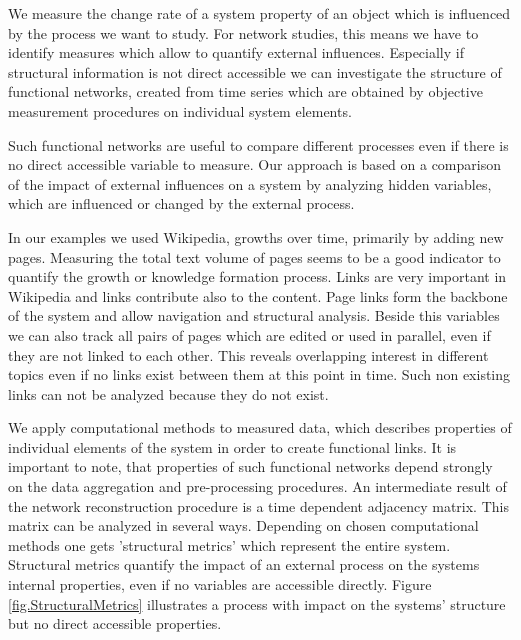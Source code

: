 \documentclass[a4paper,10pt]{scrbook}
\begin{document}
We measure the change rate of a system property of an object which is influenced by the process we want to study. For network studies, this means we have to identify measures which allow to quantify external influences. Especially if structural information is not direct accessible we can investigate the structure of functional networks, created from time series which are obtained by objective measurement procedures on individual system elements.

Such functional networks are useful to compare different processes even if there is no direct accessible variable to measure. Our approach is based on a comparison of the impact of external influences on a system by analyzing hidden variables, which are influenced or changed by the external process. 

In our examples we used Wikipedia, growths over time, primarily by adding new pages. Measuring the total text volume of pages seems to be a good indicator to quantify the growth or knowledge formation process. Links are very important in Wikipedia and links contribute also to the content. Page links form the backbone of the system and allow navigation and structural analysis. Beside this variables we can also track all pairs of pages which are edited or used in parallel, even if they are not linked to each other. This reveals overlapping interest in different topics even if no links exist between them at this point in time. Such non existing links can not be analyzed because they do not exist. 


We apply computational methods to measured data, which describes properties of individual elements of the system in order to create functional links. It is important to note, that properties of such functional networks depend strongly on the data  aggregation and pre-processing procedures. An intermediate result of the network reconstruction procedure is a time dependent adjacency matrix. This matrix can be analyzed in several ways. Depending on chosen computational methods one gets 'structural metrics' which represent the entire system. Structural metrics quantify the impact of an external process on the systems internal properties, even if no variables are accessible directly. Figure \ref{fig.StructuralMetrics} illustrates a process with impact on the systems' structure but no direct accessible properties. 

\label{ext.fig.StructuralMetrics} 

\end{document}
